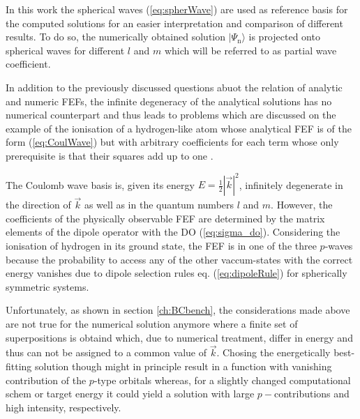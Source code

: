 In this work the spherical waves (\ref{eq:spherWave}) are used as reference basis for the computed solutions for an easier interpretation and comparison of different results.
To do so, the numerically obtained solution $|\Psi_\text{n}\rangle$ is projected onto spherical waves for different $l$ and $m$ which will be referred to as partial wave coefficient.

In addition to the previously discussed questions abuot the relation of analytic and numeric FEFs, the infinite degeneracy of the analytical solutions has no numerical counterpart and thus leads to problems which are discussed on the example of the ionisation of a hydrogen-like atom whose analytical FEF is of the form (\ref{eq:CoulWave}) but with arbitrary coefficients for each term whose only prerequisite is that their squares add up to one \cite{Lifschitz}.
%

The Coulomb wave basis is, given its energy $E=\frac 12 |\vec{k}|^2$, infinitely degenerate in the direction of $\vec{k}$ as well as in the quantum numbers $l$ and $m$.
However, the coefficients of the physically observable FEF are determined by the matrix elements of the dipole operator with the DO (\ref{eq:sigma_do}).
Considering the ionisation of hydrogen in its ground state, the FEF is in one of the three $p$-waves because the probability to access any of the other vaccum-states with the correct energy vanishes due to dipole selection rules eq. (\ref{eq:dipoleRule}) for spherically symmetric systems.

Unfortunately, as shown in section \ref{ch:BCbench}, the considerations made above are not true for the numerical solution anymore where a finite set of superpositions is obtaind which, due to numerical treatment, differ in energy and thus can not be assigned to a common value of $\vec{k}$.
Chosing the energetically best-fitting solution though might in principle result in a function with vanishing contribution of the $p$-type orbitals whereas, for a slightly changed computational schem or target energy it could yield a solution with large $p-$contributions and high intensity, respectively.

